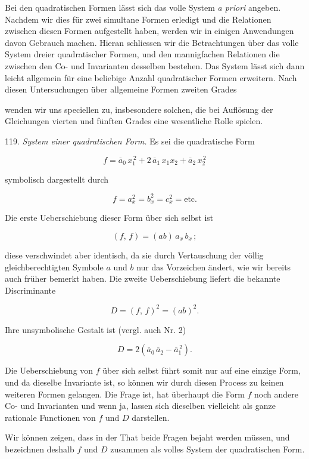 Bei den quadratischen Formen lässt sich das volle System \textit{a priori}
angeben. Nachdem wir dies für zwei simultane Formen erledigt und
die Relationen zwischen diesen Formen aufgestellt haben, werden wir
in einigen Anwendungen davon Gebrauch machen. Hieran schliessen
wir die Betrachtungen über das volle System dreier quadratischer
Formen, und den mannigfachen Relationen die zwischen den Co- und
Invarianten desselben bestehen. Das System lässt sich dann leicht
allgemein für eine beliebige Anzahl quadratischer Formen erweitern.
Nach diesen Untersuchungen über allgemeine Formen zweiten Grades


wenden wir uns speciellen zu, insbesondere solchen, die bei Auflösung
der Gleichungen vierten und fünften Grades eine wesentliche Rolle
spielen.

119. \textit{System einer quadratischen Form.} Es sei die quadratische
Form

\[
f = \overline{a}_0\,x_1^{\,2} + 2\,\overline{a}_1\,x_1 x_2 + \overline{a}_2\,x_2^{\,2}
\]

symbolisch dargestellt durch

\[
f = a_x^2 = b_x^2 = c_x^2 = \text{etc.}
\]

Die erste Ueberschiebung dieser Form über sich selbst ist

\[
(f,\,f) = (ab)\,a_x\,b_x\,;
\]

diese verschwindet aber identisch, da sie durch Vertauschung der völlig
gleichberechtigten Symbole $a$ und $b$ nur das Vorzeichen ändert, wie
wir bereits auch früher bemerkt haben. Die zweite Ueberschiebung
liefert die bekannte Discriminante

\[
D = (f,\,f)^2 = (ab)^2.
\]

Ihre unsymbolische Gestalt ist (vergl. auch Nr. 2)

\[
D = 2(\overline{a}_0\,\overline{a}_2 - \overline{a}_1^{\,2}).
\]

Die Ueberschiebung von $f$ über sich selbst führt somit nur auf eine
einzige Form, und da dieselbe Invariante ist, so können wir durch
diesen Process zu keinen weiteren Formen gelangen. Die Frage ist,
hat überhaupt die Form $f$ noch andere Co- und Invarianten und wenn
ja, lassen sich dieselben vielleicht als ganze rationale Functionen von
$f$ und $D$ darstellen.

Wir können zeigen, dass in der That beide Fragen bejaht werden
müssen, und bezeichnen deshalb $f$ und $D$ zusammen als volles System
der quadratischen Form.

